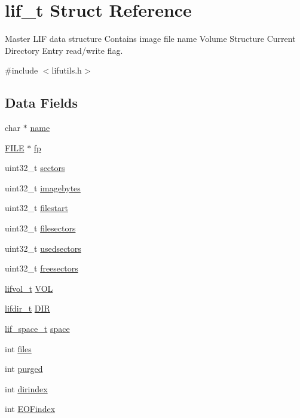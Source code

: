 \hypertarget{structlif__t}{}\section{lif\+\_\+t Struct Reference}
\label{structlif__t}


Master L\+IF data structure Contains image file name Volume Structure Current Directory Entry read/write flag.  




{\ttfamily \#include $<$lifutils.\+h$>$}

\subsection*{Data Fields}
\begin{DoxyCompactItemize}
\item 
char $\ast$ \hyperlink{structlif__t_ae6b943f3c26005fc375169960e9049f7}{name}
\item 
\hyperlink{posix_8h_aed4dabeb9f7c518ded42f930a04abce8}{F\+I\+LE} $\ast$ \hyperlink{structlif__t_ad679ba16ca21371a649981a4cca9e64c}{fp}
\item 
uint32\+\_\+t \hyperlink{structlif__t_a262b14d8547abff49d9dd1b445faf6d5}{sectors}
\item 
uint32\+\_\+t \hyperlink{structlif__t_afabd64e66adb03eef2249b6c627faac7}{imagebytes}
\item 
uint32\+\_\+t \hyperlink{structlif__t_a3c1bcc66b694d07ebc304ef7cb66b4ef}{filestart}
\item 
uint32\+\_\+t \hyperlink{structlif__t_a1223702cce63f879654d51773243643d}{filesectors}
\item 
uint32\+\_\+t \hyperlink{structlif__t_ad81767a2f65b997d5abecba130b89814}{usedsectors}
\item 
uint32\+\_\+t \hyperlink{structlif__t_a1fc11461eb5643d84e229772f7623152}{freesectors}
\item 
\hyperlink{structlifvol__t}{lifvol\+\_\+t} \hyperlink{structlif__t_ae68126d2b9261ef9a6903a95d5c82cac}{V\+OL}
\item 
\hyperlink{structlifdir__t}{lifdir\+\_\+t} \hyperlink{structlif__t_aefeaa526c04a2b8715b0392feeec52a3}{D\+IR}
\item 
\hyperlink{structlif__space__t}{lif\+\_\+space\+\_\+t} \hyperlink{structlif__t_ab9646edba4028b4c78bd3ccb6c523143}{space}
\item 
int \hyperlink{structlif__t_aceca398e2e3f6bcffe1593969544d546}{files}
\item 
int \hyperlink{structlif__t_a1dfef3ca99d6ba9680bb9b6bf8fafc32}{purged}
\item 
int \hyperlink{structlif__t_a74f8af3dc203c3c6b9dea3829bb4b6fa}{dirindex}
\item 
int \hyperlink{structlif__t_a68c465a879c7d4bd2279682185b6250e}{E\+O\+Findex}
\end{DoxyCompactItemize}


